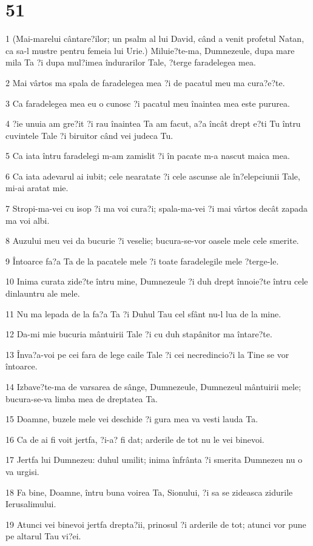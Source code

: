 \chapter{51}

\par 1 (Mai-marelui cântare?ilor; un psalm al lui David, când a venit profetul Natan, ca sa-l mustre pentru femeia lui Urie.) Miluie?te-ma, Dumnezeule, dupa mare mila Ta ?i dupa mul?imea îndurarilor Tale, ?terge faradelegea mea.
\par 2 Mai vârtos ma spala de faradelegea mea ?i de pacatul meu ma cura?e?te.
\par 3 Ca faradelegea mea eu o cunosc ?i pacatul meu înaintea mea este pururea.
\par 4 ?ie unuia am gre?it ?i rau înaintea Ta am facut, a?a încât drept e?ti Tu întru cuvintele Tale ?i biruitor când vei judeca Tu.
\par 5 Ca iata întru faradelegi m-am zamislit ?i în pacate m-a nascut maica mea.
\par 6 Ca iata adevarul ai iubit; cele nearatate ?i cele ascunse ale în?elepciunii Tale, mi-ai aratat mie.
\par 7 Stropi-ma-vei cu isop ?i ma voi cura?i; spala-ma-vei ?i mai vârtos decât zapada ma voi albi.
\par 8 Auzului meu vei da bucurie ?i veselie; bucura-se-vor oasele mele cele smerite.
\par 9 Întoarce fa?a Ta de la pacatele mele ?i toate faradelegile mele ?terge-le.
\par 10 Inima curata zide?te întru mine, Dumnezeule ?i duh drept înnoie?te întru cele dinlauntru ale mele.
\par 11 Nu ma lepada de la fa?a Ta ?i Duhul Tau cel sfânt nu-l lua de la mine.
\par 12 Da-mi mie bucuria mântuirii Tale ?i cu duh stapânitor ma întare?te.
\par 13 Înva?a-voi pe cei fara de lege caile Tale ?i cei necredincio?i la Tine se vor întoarce.
\par 14 Izbave?te-ma de varsarea de sânge, Dumnezeule, Dumnezeul mântuirii mele; bucura-se-va limba mea de dreptatea Ta.
\par 15 Doamne, buzele mele vei deschide ?i gura mea va vesti lauda Ta.
\par 16 Ca de ai fi voit jertfa, ?i-a? fi dat; arderile de tot nu le vei binevoi.
\par 17 Jertfa lui Dumnezeu: duhul umilit; inima înfrânta ?i smerita Dumnezeu nu o va urgisi.
\par 18 Fa bine, Doamne, întru buna voirea Ta, Sionului, ?i sa se zideasca zidurile Ierusalimului.
\par 19 Atunci vei binevoi jertfa drepta?ii, prinosul ?i arderile de tot; atunci vor pune pe altarul Tau vi?ei.


